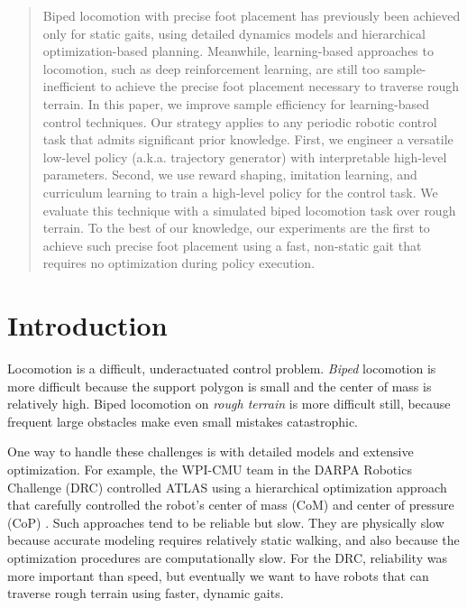 \documentclass[conference]{IEEEtran}
\begin{document}
\begin{abstract}
  Biped locomotion with precise foot placement has previously been achieved only for static gaits, using detailed dynamics models and hierarchical optimization-based planning.
  Meanwhile, learning-based approaches to locomotion, such as deep reinforcement learning, are still too sample-inefficient to achieve the precise foot placement necessary to traverse rough terrain.
  In this paper, we improve sample efficiency for learning-based control techniques.
  Our strategy applies to any periodic robotic control task that admits significant prior knowledge.
  First, we engineer a versatile low-level policy (a.k.a. trajectory generator) with interpretable high-level parameters.
  Second, we use reward shaping, imitation learning, and curriculum learning to train a high-level policy for the control task.
  We evaluate this technique with a simulated biped locomotion task over rough terrain.
  To the best of our knowledge, our experiments are the first to achieve such precise foot placement
  using a fast, non-static gait that requires no optimization during policy execution.
\end{abstract}

\IEEEpeerreviewmaketitle


\section{Introduction} \label{sec:intro}

Locomotion is a difficult, underactuated control problem.
\emph{Biped} locomotion is more difficult because the support polygon is small and the center of mass is relatively high.
Biped locomotion on \emph{rough terrain} is more difficult still, because frequent large obstacles make even small mistakes catastrophic.

One way to handle these challenges is with detailed models and extensive optimization.
For example, the WPI-CMU team in the DARPA Robotics Challenge (DRC) controlled ATLAS using a hierarchical optimization approach that carefully controlled the robot's center of mass (CoM) and center of pressure (CoP) \citep{feng2015optimization}.
Such approaches tend to be reliable but slow.
They are physically slow because accurate modeling requires relatively static walking, and also because the optimization procedures are computationally slow.
For the DRC, reliability was more important than speed, but eventually we want to have robots that can traverse rough terrain using faster, dynamic gaits.
\end{document}
